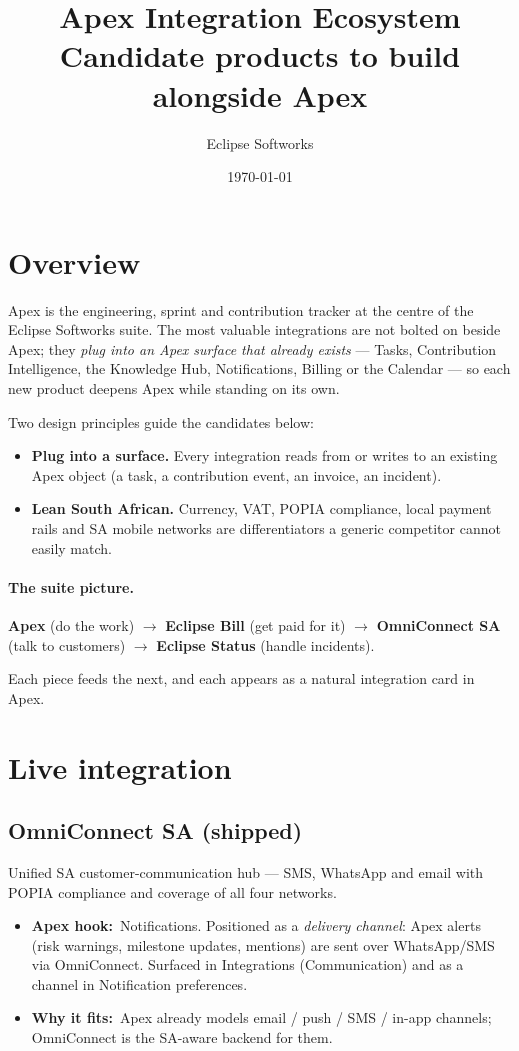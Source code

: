 \documentclass[11pt]{article}
\title{\vspace{-1.5cm}\textbf{Apex Integration Ecosystem}\\[0.3em]
\large\color{muted}Candidate products to build alongside Apex}
\author{Eclipse Softworks}
\date{\today}
\newcommand{\hook}[1]{\textbf{Apex hook:}~#1}
\newcommand{\fit}[1]{\textbf{Why it fits:}~#1}
\begin{document}
\maketitle
\vspace{-0.8cm}

\section{Overview}
Apex is the engineering, sprint and contribution tracker at the centre of the
Eclipse Softworks suite. The most valuable integrations are not bolted on beside
Apex; they \emph{plug into an Apex surface that already exists} --- Tasks,
Contribution Intelligence, the Knowledge Hub, Notifications, Billing or the
Calendar --- so each new product deepens Apex while standing on its own.

Two design principles guide the candidates below:
\begin{itemize}
  \item \textbf{Plug into a surface.} Every integration reads from or writes to an existing Apex object (a task, a contribution event, an invoice, an incident).
  \item \textbf{Lean South African.} Currency, VAT, POPIA compliance, local payment rails and SA mobile networks are differentiators a generic competitor cannot easily match.
\end{itemize}

\paragraph{The suite picture.}
\begin{center}
\textbf{Apex} (do the work) $\rightarrow$ \textbf{Eclipse Bill} (get paid for it)
$\rightarrow$ \textbf{OmniConnect SA} (talk to customers) $\rightarrow$
\textbf{Eclipse Status} (handle incidents).
\end{center}
Each piece feeds the next, and each appears as a natural integration card in Apex.

\section{Live integration}
\subsection{OmniConnect SA \hfill\small\color{muted}(shipped)}
Unified SA customer-communication hub --- SMS, WhatsApp and email with POPIA
compliance and coverage of all four networks.
\begin{itemize}
  \item \hook{Notifications.} Positioned as a \emph{delivery channel}: Apex alerts (risk warnings, milestone updates, mentions) are sent over WhatsApp/SMS via OmniConnect. Surfaced in Integrations (Communication) and as a channel in Notification preferences.
  \item \fit{Apex already models email / push / SMS / in-app channels; OmniConnect is the SA-aware backend for them.}
\end{itemize}
\end{document}
